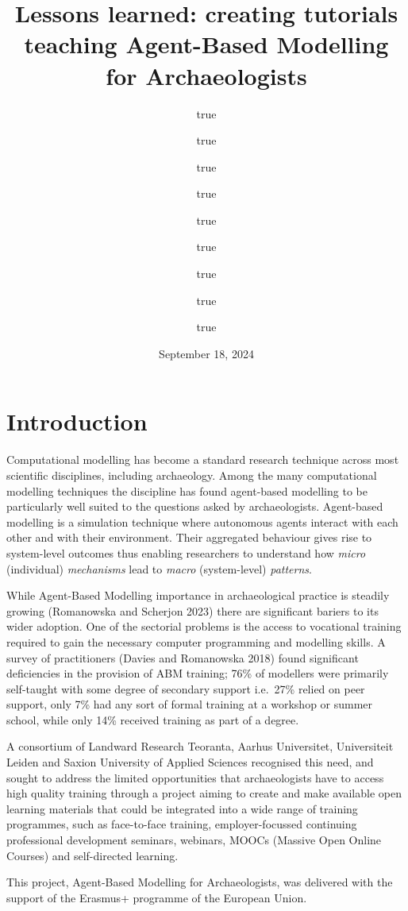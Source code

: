 \documentclass[
]{article}
\title{Lessons learned: creating tutorials teaching Agent-Based Modelling for Archaeologists}
\author{true \and true \and true \and true \and true \and true \and true \and true \and true}
\date{September 18, 2024}
\begin{document}
\maketitle

{
\setcounter{tocdepth}{2}
\tableofcontents
}
\hypertarget{introduction}{%
\section{Introduction}\label{introduction}}

Computational modelling has become a standard research technique across most scientific disciplines, including archaeology. Among the many computational modelling techniques the discipline has found agent-based modelling to be particularly well suited to the questions asked by archaeologists. Agent-based modelling is a simulation technique where autonomous agents interact with each other and with their environment. Their aggregated behaviour gives rise to system-level outcomes thus enabling researchers to understand how \emph{micro} (individual) \emph{mechanisms} lead to \emph{macro} (system-level) \emph{patterns}.

While Agent-Based Modelling importance in archaeological practice is steadily growing (Romanowska and Scherjon 2023) there are significant bariers to its wider adoption. One of the sectorial problems is the access to vocational training required to gain the necessary computer programming and modelling skills. A survey of practitioners (Davies and Romanowska 2018) found significant deficiencies in the provision of ABM training; 76\% of modellers were primarily self-taught with some degree of secondary support i.e.~27\% relied on peer support, only 7\% had any sort of formal training at a workshop or summer school, while only 14\% received training as part of a degree.

A consortium of Landward Research Teoranta, Aarhus Universitet, Universiteit Leiden and Saxion University of Applied Sciences recognised this need, and sought to address the limited opportunities that archaeologists have to access high quality training through a project aiming to create and make available open learning materials that could be integrated into a wide range of training programmes, such as face-to-face training, employer-focussed continuing professional development seminars, webinars, MOOCs (Massive Open Online Courses) and self-directed learning.

This project, Agent-Based Modelling for Archaeologists, was delivered with the support of the Erasmus+ programme of the European Union.
\end{document}
